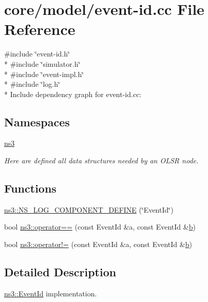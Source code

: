 \hypertarget{event-id_8cc}{}\section{core/model/event-\/id.cc File Reference}
\label{event-id_8cc}
{\ttfamily \#include \char`\"{}event-\/id.\+h\char`\"{}}\\*
{\ttfamily \#include \char`\"{}simulator.\+h\char`\"{}}\\*
{\ttfamily \#include \char`\"{}event-\/impl.\+h\char`\"{}}\\*
{\ttfamily \#include \char`\"{}log.\+h\char`\"{}}\\*
Include dependency graph for event-\/id.cc\+:
\subsection*{Namespaces}
\begin{DoxyCompactItemize}
\item 
 \hyperlink{namespacens3}{ns3}
\begin{DoxyCompactList}\small\item\em Here are defined all data structures needed by an O\+L\+SR node. \end{DoxyCompactList}\end{DoxyCompactItemize}
\subsection*{Functions}
\begin{DoxyCompactItemize}
\item 
\hyperlink{namespacens3_af9b88b685afca20a82edd3359af47e3c}{ns3\+::\+N\+S\+\_\+\+L\+O\+G\+\_\+\+C\+O\+M\+P\+O\+N\+E\+N\+T\+\_\+\+D\+E\+F\+I\+NE} (\char`\"{}Event\+Id\char`\"{})
\item 
bool \hyperlink{namespacens3_a2d3cc69eb711b3725cb61ada3cc809b7}{ns3\+::operator==} (const Event\+Id \&a, const Event\+Id \&\hyperlink{lte__pathloss_8m_a21ad0bd836b90d08f4cf640b4c298e7c}{b})
\item 
bool \hyperlink{namespacens3_a0e536270588dd9093d35cc0676afcf5d}{ns3\+::operator!=} (const Event\+Id \&a, const Event\+Id \&\hyperlink{lte__pathloss_8m_a21ad0bd836b90d08f4cf640b4c298e7c}{b})
\end{DoxyCompactItemize}


\subsection{Detailed Description}
\hyperlink{classns3_1_1EventId}{ns3\+::\+Event\+Id} implementation. 